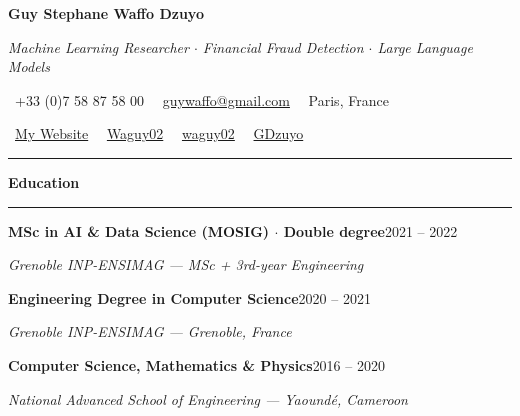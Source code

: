 \documentclass[10pt,letterpaper]{article}
\newcommand{\sechead}[1]{%
  \par\vspace{5pt}
  {\color{accent}\bfseries\small #1}\par
  {\vspace{1.5pt}\color{accent!40}\rule{\linewidth}{0.5pt}}\par\vspace{2.5pt}}
\newcommand{\entry}[3]{%
  \par\vspace{3pt}
  \textbf{#1}\hfill{\color{soft}\small #2}\par
  {\color{soft}\small\itshape #3}\par\vspace{0.5pt}}
\begin{document}
\begin{center}
  {\displayfont\fontsize{27}{30}\selectfont\bfseries Guy Stephane Waffo Dzuyo}\par\vspace{2pt}
  {\color{accent}\itshape\small Machine Learning Researcher \(\cdot\) Financial Fraud Detection \(\cdot\) Large Language Models}\par\vspace{5pt}
  {\color{soft}\scriptsize
    \faPhone\ +33 (0)7 58 87 58 00 \;\;\
    \faEnvelope\ \href{mailto:guywaffo@gmail.com}{guywaffo@gmail.com} \;\;\
    \faMapMarker\ Paris, France}\par\vspace{2pt}
  {\color{soft}\scriptsize
    \faHome\ \href{https://waguy02.github.io/PHD-Research-Website/}{My Website} \;\;\
    \faGithub\ \href{https://github.com/Waguy02}{Waguy02} \;\;\
    \faLinkedin\ \href{https://linkedin.com/in/waguy02}{waguy02} \;\;\
    \faTwitter\ \href{https://twitter.com/GDzuyo}{GDzuyo}}\par
\end{center}
{\vspace{2pt}\color{accent}\rule{\linewidth}{1.1pt}}

\sechead{Education}
\entry{MSc in AI \& Data Science (MOSIG) \(\cdot\) Double degree}{2021 -- 2022}{Grenoble INP-ENSIMAG --- MSc + 3rd-year Engineering}
\entry{Engineering Degree in Computer Science}{2020 -- 2021}{Grenoble INP-ENSIMAG --- Grenoble, France}
\entry{Computer Science, Mathematics \& Physics}{2016 -- 2020}{National Advanced School of Engineering --- Yaoundé, Cameroon}
\end{document}
